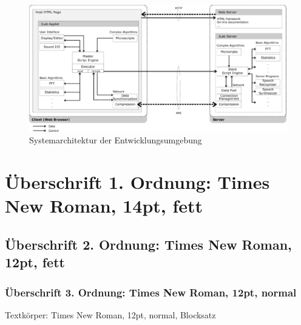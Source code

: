 \documentclass[12pt,a4paper]{article}
\begin{document}
\begin{figure}[hbt]
  \centering
  \includegraphics[scale=.45]{abbildung_1}
  \caption{Systemarchitektur der Entwicklungsumgebung}
  \label{fig:abbildung_1}
\end{figure}

\section{Überschrift 1. Ordnung: Times New Roman, 14pt, fett}

\subsection{Überschrift 2. Ordnung: Times New Roman, 12pt, fett}

\subsubsection{Überschrift 3. Ordnung: Times New Roman, 12pt, normal}

Textkörper: Times New Roman, 12pt, normal, Blocksatz

\nocite{Fellbaum1999}
\nocite{2003_ESSV_MM}



\end{document}
